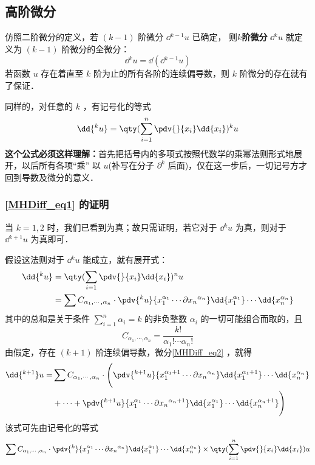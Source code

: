\subsection{高阶微分}
仿照二阶微分的定义，若 $(k-1)$ 阶微分 $\dd{^{k-1}}u$ 已确定， 则\textbf{$k$阶微分} $\dd{^ku}$ 就定义为 $(k-1)$ 阶微分的全微分：
\begin{equation}
\dd{^k u}=\dd{(\dd{^{k-1}}u)}
\end{equation}
若函数 $u$ 存在着直至 $k$ 阶为止的所有各阶的连续偏导数，则 $k$ 阶微分的存在就有了保证．

 同样的，对任意的 $k$ ，有记号化的等式
 \begin{equation}\label{MHDiff_eq1}
 \dd{^ku}=\qty(\sum_{i=1}^n\pdv{}{x_i}\dd{x_i})^k u
 \end{equation}
 \textbf{这个公式必须这样理解：}首先把括号内的多项式按照代数学的乘幂法则形式地展开，以后所有各项“乘” 以 $u$(补写在分子 $\partial^k$ 后面)，仅在这一步后，一切记号方才回到导数及微分的意义．
 \subsubsection{\autoref{MHDiff_eq1} 的证明}
 当 $k=1,2$ 时，我们已看到为真；故只需证明，若它对于 $\dd{^k u}$ 为真，则对于 $\dd{^{k+1}u}$ 为真即可．
 
 假设这法则对于 $\dd{^k u}$ 能成立，就有展开式：
 \begin{equation}\label{MHDiff_eq2}
 \begin{aligned}
 \dd{^k u}&=\qty(\sum_{i=1}\pdv{}{x_i}\dd{x_i})^n u\\
 &=\sum C_{\alpha_1,\cdots,\alpha_n}\cdot\pdv{^k u}{x_1^{\alpha_1}\cdots\partial{x_n}^{\alpha_n}}\dd{x_1^{\alpha_1}}\cdots\dd{x_n^{\alpha_n}}
 \end{aligned}
 \end{equation}
 其中的总和是关于条件 $\sum_{i=1}^n\alpha_i=k$ 的非负整数 $\alpha_i$ 的一切可能组合而取的，且
 \begin{equation}
 C_{\alpha_1,\cdots,\alpha_n}=\frac{k!}{\alpha_1!\cdots\alpha_n!}
 \end{equation}
 由假定，存在 $(k+1)$ 阶连续偏导数，微分\autoref{MHDiff_eq2} ，就得
 \begin{equation}
  \begin{aligned}
 \dd{^{k+1}}u=&\sum C_{\alpha_1,\cdots,\alpha_n}\cdot\Bigg(\pdv{^{k+1} u}{x_1^{\alpha_1+1}\cdots\partial{x_n}^{\alpha_n}}\dd{x_1^{\alpha_1+1}}\cdots\dd{x_n^{\alpha_n}}\\
 &+\cdots+\pdv{^{k+1} u}{x_1^{\alpha_1}\cdots\partial{x_n}^{\alpha_n+1}}\dd{x_1^{\alpha_1}}\cdots\dd{x_n^{\alpha_n+1}}\Bigg)
 \end{aligned}
 \end{equation}
 该式可先由记号化的等式
 \begin{equation}
 \sum C_{\alpha_1,\cdots,\alpha_n}\cdot\pdv{^{k} }{x_1^{\alpha_1}\cdots\partial{x_n}^{\alpha_n}}\dd{x_1^{\alpha_1}}\cdots\dd{x_n^{\alpha_n}}\times\qty(\sum_{i=1}^n\pdv{}{x_i}\dd{x_i})u
 \end{equation}
 
